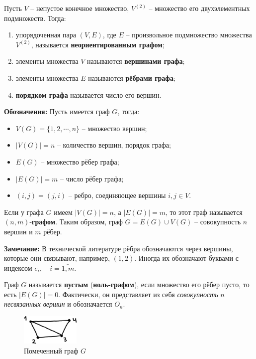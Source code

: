 \documentclass[12pt, a4paper]{article}
\begin{document}
Пусть $V$ -- непустое конечное множество, $V^{(2)}$ -- множество его двухэлементных подмножеств. Тогда:
\begin{enumerate}
 \item упорядоченная пара $(V, E)$, где $E$ -- произвольное подмножество множества $V^{(2)}$, называется \textbf{неориентированным графом};
 \item элементы множества $V$ называются \textbf{вершинами графа};
 \item элементы множества $E$ называются \textbf{рёбрами графа};
 \item \textbf{порядком графа} называется число его вершин.
\end{enumerate}
\textbf{Обозначения:} Пусть имеется граф $G$, тогда:
\begin{itemize}
 \item $V(G) = \{ 1, 2, \cdots, n \}$ -- множество вершин;
 \item $|V(G)| = n$ -- количество вершин, порядок графа;
 \item $E(G)$ -- множество рёбер графа;
 \item $|E(G)| = m$ -- число рёбер графа;
 \item $(i,j)=(j,i)$ -- ребро, соединяющее вершины $i,j \in V$.
\end{itemize}

Если у графа $G$ имеем $|V(G)| = n$, а $|E(G)| = m$, то этот граф называется $(n, m)$-\textbf{графом}. Таким образом, граф $G = E(G) \cup V(G)$ -- совокупность $n$ вершин и $m$ рёбер.

\textbf{Замечание:} В технической литературе рёбра обозначаются через вершины, которые они связывают, например, $(1, 2)$. Иногда их обозначают буквами с индексом $e_i, \quad i=\bar{1,m}$.

Граф $G$ называется \textbf{пустым} (\textbf{ноль-графом}), если множество его рёбер пусто, то есть $|E(G)| = 0$. Фактически, он представляет из себя \textit{совокупность} $n$ \textit{несвязанных вершин} и обозначается $O_n$.

\begin{figure}
  \centering
  \includegraphics[width=0.25\textwidth]{26}
  \vspace{-4mm}
  \caption{Помеченный граф $G$}
\end{figure}
\end{document}
